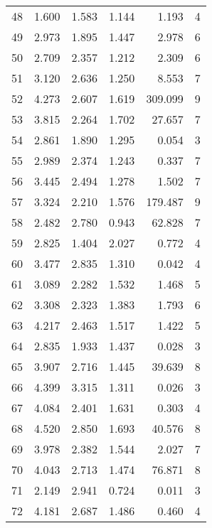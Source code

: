 \begin{tabular}{lrrrrr}
48  &     1.600 &      1.583 &      1.144 &    1.193 &        4 \\
49  &     2.973 &      1.895 &      1.447 &    2.978 &        6 \\
50  &     2.709 &      2.357 &      1.212 &    2.309 &        6 \\
51  &     3.120 &      2.636 &      1.250 &    8.553 &        7 \\
52  &     4.273 &      2.607 &      1.619 &  309.099 &        9 \\
53  &     3.815 &      2.264 &      1.702 &   27.657 &        7 \\
54  &     2.861 &      1.890 &      1.295 &    0.054 &        3 \\
55  &     2.989 &      2.374 &      1.243 &    0.337 &        7 \\
56  &     3.445 &      2.494 &      1.278 &    1.502 &        7 \\
57  &     3.324 &      2.210 &      1.576 &  179.487 &        9 \\
58  &     2.482 &      2.780 &      0.943 &   62.828 &        7 \\
59  &     2.825 &      1.404 &      2.027 &    0.772 &        4 \\
60  &     3.477 &      2.835 &      1.310 &    0.042 &        4 \\
61  &     3.089 &      2.282 &      1.532 &    1.468 &        5 \\
62  &     3.308 &      2.323 &      1.383 &    1.793 &        6 \\
63  &     4.217 &      2.463 &      1.517 &    1.422 &        5 \\
64  &     2.835 &      1.933 &      1.437 &    0.028 &        3 \\
65  &     3.907 &      2.716 &      1.445 &   39.639 &        8 \\
66  &     4.399 &      3.315 &      1.311 &    0.026 &        3 \\
67  &     4.084 &      2.401 &      1.631 &    0.303 &        4 \\
68  &     4.520 &      2.850 &      1.693 &   40.576 &        8 \\
69  &     3.978 &      2.382 &      1.544 &    2.027 &        7 \\
70  &     4.043 &      2.713 &      1.474 &   76.871 &        8 \\
71  &     2.149 &      2.941 &      0.724 &    0.011 &        3 \\
72  &     4.181 &      2.687 &      1.486 &    0.460 &        4 \\

\end{tabular}
